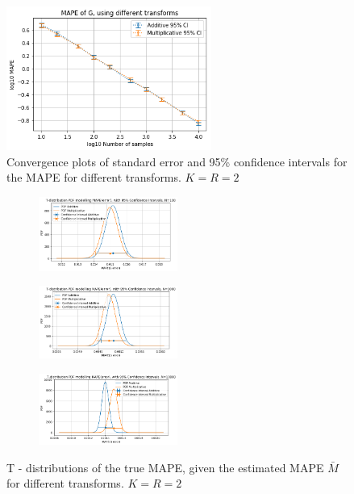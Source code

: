 \begin{figure}[H]
\begin{center}
    \includegraphics[width=0.6\textwidth]{figures/convergence_KR2.png}
\caption{Convergence plots of standard error and 95\% confidence intervals for the MAPE for different transforms. \(K=R=2\)}
\label{fig:Convergence_Transforms_KR2}
\end{center}
\end{figure}

\begin{figure}[H]
\begin{center}
\begin{subfigure}
    \centering
    \includegraphics[width=0.5\textwidth]{figures/KR2N100_post.png}
\end{subfigure}
\begin{subfigure}
    \centering
    \includegraphics[width=0.5\textwidth]{figures/KR2N1000_post.png}
\end{subfigure}
\begin{subfigure}
    \centering
    \includegraphics[width=0.5\textwidth]{figures/KR2N10000_post.png}
\end{subfigure}
\caption{ T - distributions of the true MAPE, given the estimated MAPE \(\bar{M}\) for different transforms. \(K=R=2\)}
\label{fig:Posterior_sigma_transforms_KR2}
\end{center}
\end{figure}

